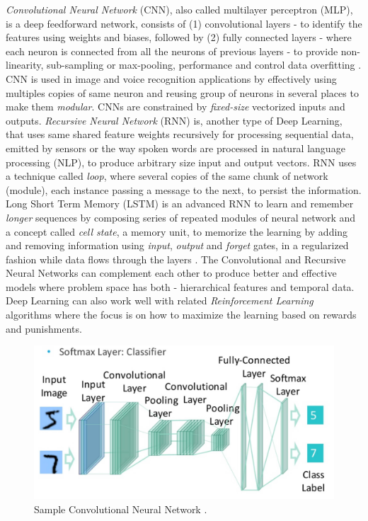 \documentclass[sigconf]{acmart}
\begin{document}
	{\em Convolutional Neural Network} (CNN), also called multilayer perceptron (MLP), is a deep feedforward network, consists of (1) convolutional layers - to identify the features using weights and biases, followed by (2) fully connected layers - where each neuron is connected from all the neurons of previous layers - to provide non-linearity, sub-sampling or max-pooling, performance and control data overfitting \cite{ChristopherOlah2014}. CNN is used in image and voice recognition applications by effectively using multiples copies of same neuron and reusing group of neurons in several places to make them {\em modular}. CNNs are constrained by {\em fixed-size} vectorized inputs and outputs. {\em Recursive Neural Network} (RNN) is, another type of Deep Learning, that uses same shared feature weights recursively for processing sequential data, emitted by sensors or the way spoken words are processed in natural language processing (NLP), to produce arbitrary size input and output vectors. RNN uses a technique called {\em loop}, where several copies of the same chunk of network (module), each instance passing a message to the next, to persist the information. Long Short Term Memory (LSTM) is an advanced RNN to learn and remember {\em longer} sequences by composing series of repeated modules of neural network and a concept called {\em cell state}, a memory unit, to memorize the learning by adding and removing information using {\em input}, {\em output} and {\em forget} gates, in a regularized fashion while data flows through the layers \cite{Olah2015}. The Convolutional and Recursive Neural Networks can complement each other to produce better and effective models where problem space has both - hierarchical features and temporal data. Deep Learning can also work well with related {\em Reinforcement Learning} algorithms where the focus is on how to maximize the learning based on rewards and punishments.	

	\begin{figure}
		\centering
		\includegraphics[width=1.0\columnwidth]{images/cnn}
		\caption{Sample Convolutional Neural Network \cite{Chang2016}.} \label{fig:figure3} 
	\end{figure}
\end{document}

